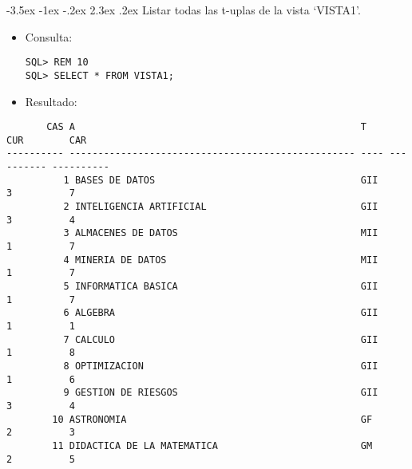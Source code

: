 \documentclass[11pt]{report}
\makeatletter
\renewcommand\chapter{\@startsection{chapter}{0}{\z@}%
    {-3.5ex \@plus -1ex \@minus -.2ex}%
    {2.3ex \@plus.2ex}%
    {\normalfont\Large\bfseries}}
\makeatother
\begin{document}
\chapter{Listar todas las t-uplas de la vista ‘VISTA1’.}
\begin{itemize}
  \item Consulta:
  \begin{verbatim}
SQL> REM 10
SQL> SELECT * FROM VISTA1;
  \end{verbatim}
  \item{Resultado:}
\end{itemize}
  \begin{verbatim}
       CAS A                                                  T           CUR        CAR                                                                                            
---------- -------------------------------------------------- ---- ---------- ----------                                                                                            
          1 BASES DE DATOS                                    GII           3          7                                                                                            
          2 INTELIGENCIA ARTIFICIAL                           GII           3          4                                                                                            
          3 ALMACENES DE DATOS                                MII           1          7                                                                                            
          4 MINERIA DE DATOS                                  MII           1          7                                                                                            
          5 INFORMATICA BASICA                                GII           1          7                                                                                            
          6 ALGEBRA                                           GII           1          1                                                                                            
          7 CALCULO                                           GII           1          8                                                                                            
          8 OPTIMIZACION                                      GII           1          6                                                                                            
          9 GESTION DE RIESGOS                                GII           3          4                                                                                            
        10 ASTRONOMIA                                         GF            2          3                                                                                            
        11 DIDACTICA DE LA MATEMATICA                         GM            2          5                                                                                            


\end{verbatim}
\end{document}
